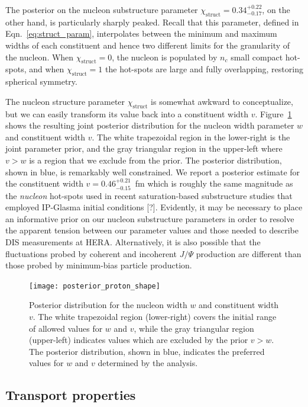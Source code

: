 \documentclass[aps,prc,reprint,amsmath,nofootinbib]{revtex4-1}
\newcommand{\X}{\chi_\mathrm{struct}}
\newcommand{\note}{\textcolor{theblue}{[?]}}
\begin{document}
The posterior on the nucleon substructure parameter $\X=0.34_{-0.17}^{+0.22}$, on the other hand, is particularly sharply peaked.
Recall that this parameter, defined in Eqn.~\eqref{eq:struct_param}, interpolates between the minimum and maximum widths of each constituent and hence
two different limits for the granularity of the nucleon.
When $\X=0$, the nucleon is populated by $n_c$ small compact hot-spots, and when $\X=1$ the hot-spots are large and fully overlapping, restoring spherical symmetry.

The nucleon structure parameter $\X$ is somewhat awkward to conceptualize, but we can easily transform its value back into a constituent width $v$.
Figure~\ref{fig:posterior_proton_shape} shows the resulting joint posterior distribution for the nucleon width parameter $w$ and constituent width $v$.
The white trapezoidal region in the lower-right is the joint parameter prior, and the gray triangular region in the upper-left where $v > w$ is a region that we exclude from the prior.
The posterior distribution, shown in blue, is remarkably well constrained.
We report a posterior estimate for the constituent width $v=0.46_{-0.15}^{+0.21}$~fm which is roughly the same magnitude as the \emph{nucleon} hot-spots used in recent saturation-based substructure studies that employed IP-Glasma initial conditions \note.
Evidently, it may be necessary to place an informative prior on our nucleon substructure parameters in order to resolve the apparent tension between our parameter values and those needed to describe DIS measurements at HERA.
Alternatively, it is also possible that the fluctuations probed by coherent and incoherent $J/\Psi$ production are different than those probed by minimum-bias particle production.

\begin{figure}
  \texttt{[image: posterior\_proton\_shape]}
  \caption{\label{fig:posterior_proton_shape}
  Posterior distribution for the nucleon width $w$ and constituent width $v$. The white trapezoidal region (lower-right) covers the initial range of allowed values for $w$ and $v$, while the gray triangular region (upper-left) indicates values which are excluded by the prior $v > w$. The posterior distribution, shown in blue, indicates the preferred values for $w$ and $v$ determined by the analysis.}
\end{figure}

\subsection{Transport properties}
\end{document}
